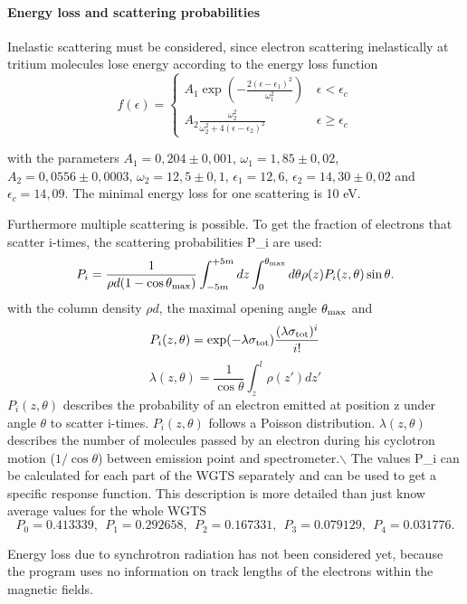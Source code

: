 \paragraph{Energy loss and scattering probabilities}\label{_s_s_cmain_eloss}
Inelastic scattering must be considered, since electron scattering inelastically at tritium molecules lose energy according to the energy loss function
\begin{equation}
	f(\epsilon)= \begin{cases}
	A_1 \exp\left(-\frac{2(\epsilon - \epsilon_1)^2}{\omega_1^2}\right)   & \, \epsilon < \epsilon_c \\
	A_2 \frac{\omega_2^2}{\omega_2^2 + 4 (\epsilon - \epsilon_2)^2} & \, \epsilon \geq \epsilon_c
	\end{cases}
	\label{eq:Energieverlust}
\end{equation}

with the parameters $A_1=0,204\pm0,001$, $\omega_1=1,85\pm0,02$, $A_2=0,0556\pm0,0003$, $\omega_2=12,5\pm0,1$, $\epsilon_1=12,6$, $\epsilon_2=14,30\pm0,02$ and $\epsilon_c=14,09$. The minimal energy loss for one scattering is 10 eV.

Furthermore multiple scattering is possible. To get the fraction of electrons that scatter i-\/times, the scattering probabilities P\_\-i are used: \[ P_i=\frac{1}{\rho d(1-\cos \theta_{\rm{max}})} \int_{-5m}^{+5m}dz \int_0^{\theta_{\rm{max}}} d\theta \rho(z)P_i(z,\theta)\sin\theta. \] with the column density $\rho d$, the maximal opening angle $\theta_{\rm{max}}$ and \[ P_i(z, \theta)=\exp (-\lambda \sigma_{\rm{tot}}) \frac{(\lambda \sigma_{\rm{tot}})^i}{i!} \] \[ \lambda(z, \theta) =\frac{1}{\cos \theta} \int_z^l\rho(z')dz' \] $P_i(z, \theta)$ describes the probability of an electron emitted at position z under angle $\theta$ to scatter i-\/times. $P_i(z, \theta)$ follows a Poisson distribution. $\lambda(z, \theta)$ describes the number of molecules passed by an electron during his cyclotron motion ($1/\cos{\theta}$) between emission point and spectrometer.$\backslash$ The values P\_\-i can be calculated for each part of the WGTS separately and can be used to get a specific response function. This description is more detailed than just know average values for the whole WGTS \[ P_0 = 0.413339, ~~ P_1 = 0.292658, ~~ P_2 = 0.167331, ~~ P_3 = 0.079129, ~~ P_4 = 0.031776. \]

Energy loss due to synchrotron radiation has not been considered yet, because the program uses no information on track lengths of the electrons within the magnetic fields. 
